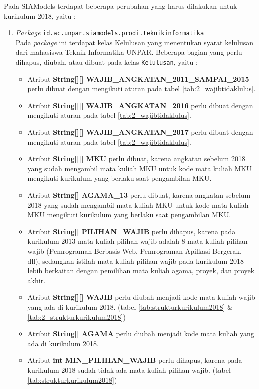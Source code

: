 Pada SIAModels terdapat beberapa perubahan yang harus dilakukan untuk kurikulum 2018, yaitu :
\begin{enumerate}
	\item \textit{Package} \texttt{id.ac.unpar.siamodels.prodi.teknikinformatika}\\
	Pada \textit{package} ini terdapat kelas Kelulusan yang menentukan syarat kelulusan dari mahasiswa Teknik Informatika UNPAR. Beberapa bagian yang perlu dihapus, diubah, atau dibuat pada kelas \texttt{Kelulusan}, yaitu :
	\begin{itemize}
		\item Atribut \textbf{String[][] WAJIB\_ANGKATAN\_2011\_SAMPAI\_2015} perlu dibuat dengan mengikuti aturan pada tabel \ref{tab:2_wajibtidaklulus}.
		\item Atribut \textbf{String[][] WAJIB\_ANGKATAN\_2016} perlu dibuat dengan mengikuti aturan pada tabel \ref{tab:2_wajibtidaklulus}.
		\item Atribut \textbf{String[][] WAJIB\_ANGKATAN\_2017} perlu dibuat dengan mengikuti aturan pada tabel \ref{tab:2_wajibtidaklulus}.
		\item Atribut \textbf{String[][] MKU} perlu dibuat, karena angkatan sebelum 2018 yang sudah mengambil mata kuliah MKU untuk kode mata kuliah MKU mengikuti kurikulum yang berlaku saat pengambilan MKU.
		\item Atribut \textbf{String[] AGAMA\_13} perlu dibuat, karena angkatan sebelum 2018 yang sudah mengambil mata kuliah MKU untuk kode mata kuliah MKU mengikuti kurikulum yang berlaku saat pengambilan MKU.
		\item Atribut \textbf{String[] PILIHAN\_WAJIB} perlu dihapus, karena pada kurikulum 2013 mata kuliah pilihan wajib adalah 8 mata kuliah pilihan wajib (Pemrograman Berbasis Web, Pemrograman Apilkasi Bergerak, dll), sedangkan istilah mata kuliah pilihan wajib pada kurikulum 2018 lebih berkaitan dengan pemilihan mata kuliah agama, proyek, dan proyek akhir.
		\item Atribut \textbf{String[][] WAJIB} perlu diubah menjadi kode mata kuliah wajib yang ada di kurikulum 2018. (tabel \ref{tab:strukturkurikulum2018} \& \ref{tab:2_strukturkurikulum2018})
		\item Atribut \textbf{String[] AGAMA} perlu diubah menjadi kode mata kuliah yang ada di kurikulum 2018.
		\item Atribut \textbf{int MIN\_PILIHAN\_WAJIB} perlu dihapus, karena pada kurikulum 2018 sudah tidak ada mata kuliah pilihan wajib. (tabel \ref{tab:strukturkurikulum2018})

\end{itemize}
\end{enumerate}
